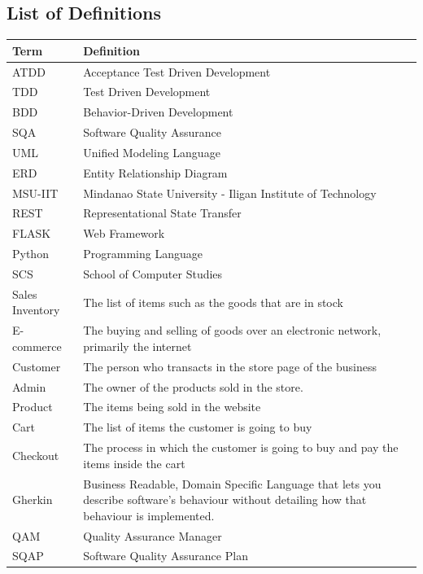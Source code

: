 \documentclass{report}
\begin{document}
\newpage

\subsection{List of Definitions}
\begin{table}[ht]
\centering
\begin{adjustbox}{width=1\textwidth,center=\textwidth}
\small
\begin{tabular}{| l | l |}
\hline
\textbf{Term} & \textbf{Definition} \\
\hline
ATDD 			& Acceptance Test Driven Development \\
TDD 				& Test Driven Development \\
BDD 				& Behavior-Driven Development \\
SQA 				& Software Quality Assurance \\
UML 				& Unified Modeling Language \\
ERD 				& Entity Relationship Diagram \\
MSU-IIT 			& Mindanao State University - Iligan Institute of Technology \\
REST 			& Representational State Transfer \\
FLASK 			& Web Framework \\
Python 			& Programming Language \\
SCS 				& School of Computer Studies \\ 
Sales Inventory 	& The list of items such as the goods that are in stock \\
E-commerce 		& The buying and selling of goods over an electronic network, primarily the internet \\
Customer 		& The person who transacts in the store page of the business \\
Admin 			& The owner of the products sold in the store. \\
Product 			& The items being sold in the website \\
Cart				& The list of items the customer is going to buy \\
Checkout 		& The process in which the customer is going to buy and pay the items inside the cart \\
Gherkin 			& Business Readable, Domain Specific Language that lets you describe software’s behaviour without detailing how that behaviour is implemented.\\
QAM 				& Quality Assurance Manager \\
SQAP 			& Software Quality Assurance Plan \\

\end{tabular}
\end{adjustbox}
\end{table}
\end{document}
